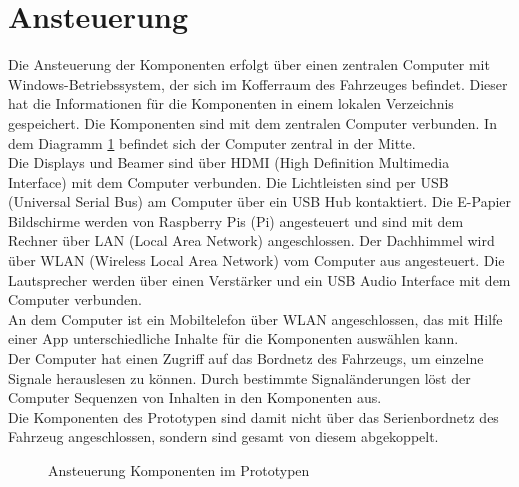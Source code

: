 \section{Ansteuerung}
Die Ansteuerung der Komponenten erfolgt über einen zentralen Computer mit Windows-Betriebssystem, der sich im Kofferraum des Fahrzeuges befindet. Dieser hat die Informationen für die Komponenten in einem lokalen Verzeichnis gespeichert. Die Komponenten sind mit dem zentralen Computer verbunden. In dem Diagramm \ref{fig:tikz_ansteuerung} befindet sich der Computer zentral in der Mitte.\\
Die Displays und Beamer sind über HDMI (High Definition Multimedia Interface) mit dem Computer verbunden. Die Lichtleisten sind per USB (Universal Serial Bus) am Computer über ein USB Hub kontaktiert. Die E-Papier Bildschirme werden von Raspberry Pis (Pi) angesteuert und sind mit dem Rechner über LAN (Local Area Network) angeschlossen. Der Dachhimmel wird über WLAN (Wireless Local Area Network) vom Computer aus angesteuert. Die Lautsprecher werden über einen Verstärker und ein USB Audio Interface mit dem Computer verbunden.\\
An dem Computer ist ein Mobiltelefon über WLAN angeschlossen, das mit Hilfe einer App unterschiedliche Inhalte für die Komponenten auswählen kann.\\
Der Computer hat einen Zugriff auf das Bordnetz des Fahrzeugs, um einzelne Signale herauslesen zu können. Durch bestimmte Signaländerungen löst der Computer Sequenzen von Inhalten in den Komponenten aus.\\
Die Komponenten des Prototypen sind damit nicht über das Serienbordnetz des Fahrzeug angeschlossen, sondern sind gesamt von diesem abgekoppelt.
\begin{figure}[hbt]
	\centering
	
	\caption[Ansteuerung Komponenten im Prototypen]{Ansteuerung Komponenten im Prototypen}
	\label{fig:tikz_ansteuerung}
\end{figure}